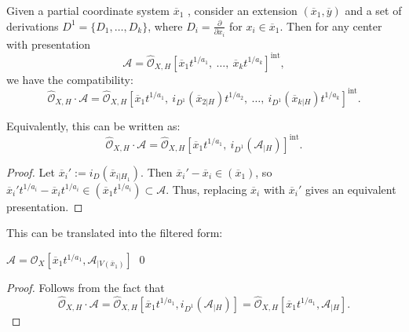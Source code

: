 \documentclass{amsart}
\newcommand{\NN}{{\mathbb{N}}}
\newcommand{\ZZ}{{\mathbb{Z}}}
\newcommand{\cA}{{\mathcal A}}
\newcommand{\cI}{{\mathcal I}}
\newcommand{\cO}{{\mathcal O}}
\newcommand{\inte}{{\operatorname{int}}}
\begin{document}
\begin{lemma} \label{spli2}Given a partial coordinate system \( \overline{x}_1 \) , consider an extension \( (\overline{x}_1, \overline{y}) \) and a set of derivations \( D^1 = \{D_1, \ldots, D_k\} \), where \( D_i = \frac{\partial}{\partial x_i} \) for \( x_i \in \overline{x}_1 \). Then for any center with presentation
\[
\mathcal{A} = \widehat{\mathcal{O}}_{X,H}\left[\overline{x}_1 t^{1/a_1},\ \ldots,\ \overline{x}_k t^{1/a_k}\right]^{\mathrm{int}},
\]
we have the compatibility:
\[
\widehat{\mathcal{O}}_{X,H} \cdot \mathcal{A} 
= \widehat{\mathcal{O}}_{X,H}\left[\overline{x}_1 t^{1/a_1},\ i_{D^1}(\overline{x}_{2|H}) t^{1/a_2},\ \ldots,\ i_{D^1}(\overline{x}_{k|H}) t^{1/a_k}\right]^{\mathrm{int}}.
\]

Equivalently, this can be written as:
\[
\widehat{\mathcal{O}}_{X,H} \cdot \mathcal{A} 
= \widehat{\mathcal{O}}_{X,H}\left[\overline{x}_1 t^{1/a_1},\ i_{D^1}(\mathcal{A}_{|H})\right]^\inte.
\]


\end{lemma}

\begin{proof}
Let $\overline{x}_i' := i_D(\overline{x}_{i|H_1})$. Then $\overline{x}_i' - \overline{x}_i \in (\overline{x}_1)$, so $\overline{x}_i' t^{1/a_i} - \overline{x}_i t^{1/a_i} \in (\overline{x}_1 t^{1/a_i}) \subset \cA$. Thus, replacing $\overline{x}_i$ with $\overline{x}_i'$ gives an equivalent presentation.
\end{proof}
This   can be translated into  the filtered form:
\begin{lemma} $\cA=\cO_X[\overline{x}_1t^{1/a_1},\cA_{|V(\overline{x}_1)}]$ \qed
\end{lemma}
\begin{proof} Follows from the fact that $$\widehat{\cO}_{X,H}\cdot \cA=\widehat{\cO}_{X,H}[\overline{x}_1 t^{1/a_1},i_{D^1} (\cA_{|H})]=\widehat{\cO}_{X,H}[\overline{x}_1 t^{1/a_1},\cA_{|H}].$$
\end{proof}


 
\end{document}
